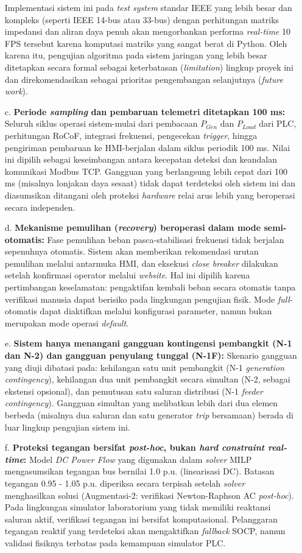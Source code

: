 \begin{enumerate}
    Implementasi sistem ini pada \textit{test system} standar IEEE yang lebih besar dan kompleks (seperti IEEE 14-bus atau 33-bus) dengan perhitungan matriks impedansi dan aliran daya penuh akan mengorbankan performa \textit{real-time} 10 FPS tersebut karena komputasi matriks yang sangat berat di Python. Oleh karena itu, pengujian algoritma pada sistem jaringan yang lebih besar ditetapkan secara formal sebagai keterbatasan (\textit{limitation}) lingkup proyek ini dan direkomendasikan sebagai prioritas pengembangan selanjutnya (\textit{future work}).
    \item[c.] \textbf{Periode \textit{sampling} dan pembaruan telemetri ditetapkan 100 ms:} Seluruh siklus operasi sistem-mulai dari pembacaan $P_{Gen}$ dan $P_{Load}$ dari PLC, perhitungan RoCoF, integrasi frekuensi, pengecekan \textit{trigger}, hingga pengiriman pembaruan ke HMI-berjalan dalam siklus periodik 100 ms. Nilai ini dipilih sebagai keseimbangan antara kecepatan deteksi dan keandalan komunikasi Modbus TCP. Gangguan yang berlangsung lebih cepat dari 100 ms (misalnya lonjakan daya sesaat) tidak dapat terdeteksi oleh sistem ini dan diasumsikan ditangani oleh proteksi \textit{hardware} relai arus lebih yang beroperasi secara independen.
    \item[d.] \textbf{Mekanisme pemulihan (\textit{recovery}) beroperasi dalam mode semi-otomatis:} Fase pemulihan beban pasca-stabilisasi frekuensi tidak berjalan sepenuhnya otomatis. Sistem akan memberikan rekomendasi urutan pemulihan melalui antarmuka HMI, dan eksekusi \textit{close breaker} dilakukan setelah konfirmasi operator melalui \textit{website}. Hal ini dipilih karena pertimbangan keselamatan: pengaktifan kembali beban secara otomatis tanpa verifikasi manusia dapat berisiko pada lingkungan pengujian fisik. Mode \textit{full}-otomatis dapat diaktifkan melalui konfigurasi parameter, namun bukan merupakan mode operasi \textit{default}.
    \item[e.] \textbf{Sistem hanya menangani gangguan kontingensi pembangkit (N-1 dan N-2) dan gangguan penyulang tunggal (N-1F):} Skenario gangguan yang diuji dibatasi pada: kehilangan satu unit pembangkit (N-1 \textit{generation contingency}), kehilangan dua unit pembangkit secara simultan (N-2, sebagai ekstensi opsional), dan pemutusan satu saluran distribusi (N-1 \textit{feeder contingency}). Gangguan simultan yang melibatkan lebih dari dua elemen berbeda (misalnya dua saluran dan satu generator \textit{trip} bersamaan) berada di luar lingkup pengujian sistem ini.
    \item[f.] \textbf{Proteksi tegangan bersifat \textit{post-hoc}, bukan \textit{hard constraint real-time}:} Model \textit{DC Power Flow} yang digunakan dalam \textit{solver} MILP mengasumsikan tegangan bus bernilai 1.0 p.u. (linearisasi DC). Batasan tegangan 0.95 - 1.05 p.u. diperiksa secara terpisah setelah \textit{solver} menghasilkan solusi (Augmentasi-2: verifikasi Newton-Raphson AC \textit{post-hoc}). Pada lingkungan simulator laboratorium yang tidak memiliki reaktansi saluran aktif, verifikasi tegangan ini bersifat komputasional. Pelanggaran tegangan reaktif yang terdeteksi akan mengaktifkan \textit{fallback} SOCP, namun validasi fisiknya terbatas pada kemampuan simulator PLC.

\end{enumerate}

